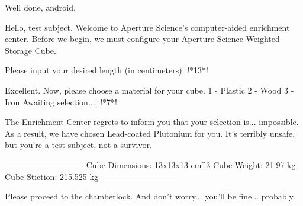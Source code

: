 \begin{frame}[fragile]{Well done, android.}\onslide<+->%
    \begin{solve}
        \tiny%
        \begin{plaintext}
Hello, test subject. Welcome to Aperture Science's computer-aided enrichment center.
Before we begin, we must configure your Aperture Science Weighted Storage Cube.

Please input your desired length (in centimeters): !*\onslide<+->\textcolor{sol@colors@lst@numbers}{13}*!

Excellent. Now, please choose a material for your cube.
  1 - Plastic
  2 - Wood
  3 - Iron
Awaiting selection...: !*\onslide<+->\textcolor{sol@colors@lst@numbers}{7}*!

The Enrichment Center regrets to inform you that your selection is... impossible.
As a result, we have chosen Lead-coated Plutonium for you. It's terribly unsafe, but you're a test subject, not a survivor.

-----------------------------
Cube Dimensions: 13x13x13 cm^3
Cube Weight:     21.97 kg
Cube Stiction:   215.525 kg
-----------------------------

Please proceed to the chamberlock. And don't worry... you'll be fine... probably.
        \end{plaintext}
    \end{solve}
\end{frame}